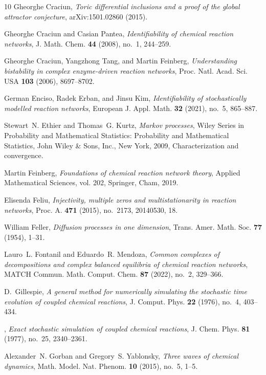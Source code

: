 \documentclass[10pt,a4paper]{amsart}
\theoremstyle{definition}
\theoremstyle{remark}
\theoremstyle{consequence}
\numberwithin{equation}{section}
\begin{document}
\begin{thebibliography}{10}
Gheorghe Craciun, \emph{Toric differential inclusions and a proof of the global
  attractor conjecture}, arXiv:1501.02860 (2015).

Gheorghe Craciun and Casian Pantea, \emph{Identifiability of chemical reaction
  networks}, J. Math. Chem. \textbf{44} (2008), no.~1, 244--259.

Gheorghe Craciun, Yangzhong Tang, and Martin Feinberg, \emph{Understanding
  bistability in complex enzyme-driven reaction networks}, Proc. Natl. Acad.
  Sci. USA \textbf{103} (2006), 8697--8702.

German Enciso, Radek Erban, and Jinsu Kim, \emph{Identifiability of
  stochastically modelled reaction networks}, European J. Appl. Math.
  \textbf{32} (2021), no.~5, 865--887.

Stewart~N. Ethier and Thomas~G. Kurtz, \emph{Markov processes}, Wiley Series in
  Probability and Mathematical Statistics: Probability and Mathematical
  Statistics, John Wiley \& Sons, Inc., New York, 2009, Characterization and
  convergence.

Martin Feinberg, \emph{Foundations of chemical reaction network theory},
  Applied Mathematical Sciences, vol. 202, Springer, Cham, 2019.

Elisenda Feliu, \emph{Injectivity, multiple zeros and multistationarity in
  reaction networks}, Proc. A. \textbf{471} (2015), no.~2173, 20140530, 18.

William Feller, \emph{Diffusion processes in one dimension}, Trans. Amer. Math.
  Soc. \textbf{77} (1954), 1--31.

Lauro~L. Fontanil and Eduardo~R. Mendoza, \emph{Common complexes of
  decompositions and complex balanced equilibria of chemical reaction
  networks}, MATCH Commun. Math. Comput. Chem. \textbf{87} (2022), no.~2,
  329--366.

D.~Gillespie, \emph{A general method for numerically simulating the stochastic
  time evolution of coupled chemical reactions}, J. Comput. Phys. \textbf{22}
  (1976), no.~4, 403--434.

\bysame, \emph{Exact stochastic simulation of coupled chemical reactions}, J.
  Chem. Phys. \textbf{81} (1977), no.~25, 2340--2361.

Alexander~N. Gorban and Gregory~S. Yablonsky, \emph{Three waves of chemical
  dynamics}, Math. Model. Nat. Phenom. \textbf{10} (2015), no.~5, 1--5.


\end{thebibliography}
\end{document}
